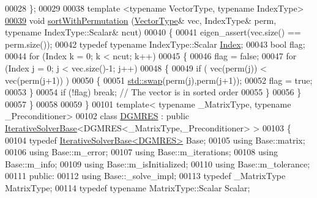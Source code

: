 \begin{DoxyCode}
00028 \};
00029 
00038 \textcolor{keyword}{template} <\textcolor{keyword}{typename} VectorType, \textcolor{keyword}{typename} IndexType>
\hyperlink{namespace_eigen_1_1internal_afe2a11c61eff70f7f68681a557fa21e7}{00039} \textcolor{keywordtype}{void} \hyperlink{namespace_eigen_1_1internal_afe2a11c61eff70f7f68681a557fa21e7}{sortWithPermutation} (\hyperlink{struct_vector_type}{VectorType}& vec, IndexType& perm, \textcolor{keyword}{typename} 
      IndexType::Scalar& ncut)
00040 \{
00041   eigen\_assert(vec.size() == perm.size());
00042   \textcolor{keyword}{typedef} \textcolor{keyword}{typename} IndexType::Scalar \hyperlink{namespace_eigen_a62e77e0933482dafde8fe197d9a2cfde}{Index}; 
00043   \textcolor{keywordtype}{bool} flag; 
00044   \textcolor{keywordflow}{for} (Index k  = 0; k < ncut; k++)
00045   \{
00046     flag = \textcolor{keyword}{false};
00047     \textcolor{keywordflow}{for} (Index j = 0; j < vec.size()-1; j++)
00048     \{
00049       \textcolor{keywordflow}{if} ( vec(perm(j)) < vec(perm(j+1)) )
00050       \{
00051         \hyperlink{endian_8c_a3ca5ecd34b04d6a243c054ac3a57f68d}{std::swap}(perm(j),perm(j+1)); 
00052         flag = \textcolor{keyword}{true};
00053       \}
00054       \textcolor{keywordflow}{if} (!flag) \textcolor{keywordflow}{break}; \textcolor{comment}{// The vector is in sorted order}
00055     \}
00056   \}
00057 \}
00058 
00059 \}
00101 \textcolor{keyword}{template}< \textcolor{keyword}{typename} \_MatrixType, \textcolor{keyword}{typename} \_Preconditioner>
00102 \textcolor{keyword}{class }\hyperlink{class_eigen_1_1_d_g_m_r_e_s}{DGMRES} : \textcolor{keyword}{public} \hyperlink{group___iterative_linear_solvers___module_class_eigen_1_1_iterative_solver_base}{IterativeSolverBase}<DGMRES<\_MatrixType,\_Preconditioner> >
00103 \{
00104     \textcolor{keyword}{typedef} \hyperlink{group___iterative_linear_solvers___module_class_eigen_1_1_iterative_solver_base}{IterativeSolverBase<DGMRES>} Base;
00105     \textcolor{keyword}{using} Base::matrix;
00106     \textcolor{keyword}{using} Base::m\_error;
00107     \textcolor{keyword}{using} Base::m\_iterations;
00108     \textcolor{keyword}{using} Base::m\_info;
00109     \textcolor{keyword}{using} Base::m\_isInitialized;
00110     \textcolor{keyword}{using} Base::m\_tolerance; 
00111   \textcolor{keyword}{public}:
00112     \textcolor{keyword}{using} Base::\_solve\_impl;
00113     \textcolor{keyword}{typedef} \_MatrixType MatrixType;
00114     \textcolor{keyword}{typedef} \textcolor{keyword}{typename} MatrixType::Scalar Scalar;

\end{DoxyCode}
